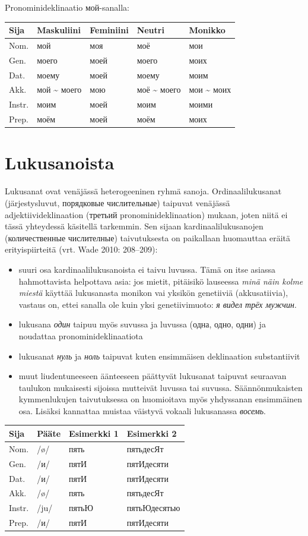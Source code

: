 \documentclass[]{scrreprt}
\providecommand{\tightlist}{%
  \setlength{\itemsep}{0pt}\setlength{\parskip}{0pt}}
\begin{document}
Pronominideklinaatio мой-sanalla:

\begin{longtable}[c]{@{}lllll@{}}
\toprule
Sija & Maskuliini & Feminiini & Neutri & Monikko\tabularnewline
\midrule
\endhead
Nom. & мой & моя & моё & мои\tabularnewline
Gen. & моего & моей & моего & моих\tabularnewline
Dat. & моему & моей & моему & моим\tabularnewline
Akk. & мой \textasciitilde{} моего & мою & моё \textasciitilde{} моего &
мои \textasciitilde{} моих\tabularnewline
Instr. & моим & моей & моим & моими\tabularnewline
Prep. & моём & моей & моём & моих\tabularnewline
\bottomrule
\end{longtable}

\section{Lukusanoista}\label{lukusanoista}

Lukusanat ovat venäjässä heterogeeninen ryhmä sanoja. Ordinaalilukusanat
(järjestysluvut, порядковые числительные) taipuvat venäjässä
adjektiivideklinaation (третьий pronominideklinaation) mukaan, joten
niitä ei tässä yhteydessä käsitellä tarkemmin. Sen sijaan
kardinaalilukusanojen (количественные числителные) taivutuksesta on
paikallaan huomauttaa eräitä erityispiirteitä (vrt. Wade 2010:
208--209):

\begin{itemize}
\tightlist
\item
  suuri osa kardinaalilukusanoista ei taivu luvussa. Tämä on itse
  asiassa hahmottavista helpottava asia: jos mietit, pitäisikö lauseessa
  \emph{minä näin kolme miestä} käyttää lukusanasta monikon vai yksikön
  genetiiviä (akkusatiivia), vastaus on, ettei sanalla ole kuin yksi
  genetiivimuoto: \emph{я видел трёх мужчин}.
\item
  lukusana \emph{один} taipuu myös suvussa ja luvussa (одна, одно, одни)
  ja noudattaa pronominideklinaatiota
\item
  lukusanat \emph{нуль} ja \emph{ноль} taipuvat kuten ensimmäisen
  deklinaation substantiivit
\item
  muut liudentuneeseen äänteeseen päättyvät lukusanat taipuvat seuraavan
  taulukon mukaisesti sijoissa mutteivät luvussa tai suvussa.
  Säännönmukaisten kymmenlukujen taivutuksessa on huomioitava myös
  yhdyssanan ensimmäinen osa. Lisäksi kannattaa muistaa väistyvä vokaali
  lukusanassa \emph{восемь}.
\end{itemize}

\begin{longtable}[c]{@{}llll@{}}
\toprule
Sija & Pääte & Esimerkki 1 & Esimerkki 2\tabularnewline
\midrule
\endhead
Nom. & /ø/ & пять & пятьдесЯт\tabularnewline
Gen. & /и/ & пятИ & пятИдесяти\tabularnewline
Dat. & /и/ & пятИ & пятИдесяти\tabularnewline
Akk. & /ø/ & пять & пятьдесЯт\tabularnewline
Instr. & /ju/ & пятьЮ & пятьЮдесятью\tabularnewline
Prep. & /и/ & пятИ & пятИдесяти\tabularnewline
\bottomrule
\end{longtable}
\end{document}
